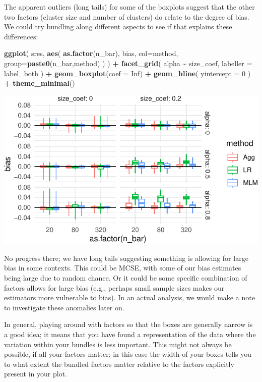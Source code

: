 \documentclass[
]{book}
\newenvironment{Shaded}{\begin{snugshade}}{\end{snugshade}}
\newcommand{\AttributeTok}[1]{\textcolor[rgb]{0.13,0.29,0.53}{#1}}
\newcommand{\ConstantTok}[1]{\textcolor[rgb]{0.56,0.35,0.01}{#1}}
\newcommand{\DecValTok}[1]{\textcolor[rgb]{0.00,0.00,0.81}{#1}}
\newcommand{\FunctionTok}[1]{\textcolor[rgb]{0.13,0.29,0.53}{\textbf{#1}}}
\newcommand{\NormalTok}[1]{#1}
\newcommand{\SpecialCharTok}[1]{\textcolor[rgb]{0.81,0.36,0.00}{\textbf{#1}}}
\begin{document}
The apparent outliers (long tails) for some of the boxplots suggest that the other two factors (cluster size and number of clusters) do relate to the degree of bias. We could try bundling along different aspects to see if that explains these differences:

\begin{Shaded}
\begin{Highlighting}[]
\FunctionTok{ggplot}\NormalTok{( sres, }\FunctionTok{aes}\NormalTok{( }\FunctionTok{as.factor}\NormalTok{(n\_bar), bias, }\AttributeTok{col=}\NormalTok{method, }\AttributeTok{group=}\FunctionTok{paste0}\NormalTok{(n\_bar,method) ) ) }\SpecialCharTok{+}
  \FunctionTok{facet\_grid}\NormalTok{( alpha }\SpecialCharTok{\textasciitilde{}}\NormalTok{  size\_coef, }\AttributeTok{labeller =}\NormalTok{ label\_both ) }\SpecialCharTok{+}
  \FunctionTok{geom\_boxplot}\NormalTok{(}\AttributeTok{coef =} \ConstantTok{Inf}\NormalTok{) }\SpecialCharTok{+}
  \FunctionTok{geom\_hline}\NormalTok{( }\AttributeTok{yintercept =} \DecValTok{0}\NormalTok{ ) }\SpecialCharTok{+}
  \FunctionTok{theme\_minimal}\NormalTok{()}
\end{Highlighting}
\end{Shaded}

\begin{center}\includegraphics[width=0.75\linewidth]{Designing-Simulations-in-R_files/figure-latex/clusterRCT_plot_bias_v2-1} \end{center}

No progress there; we have long tails suggesting something is allowing for large bias in some contexts.
This could be MCSE, with some of our bias estimates being large due to random chance.
Or it could be some specific combination of factors allows for large bias (e.g., perhaps small sample sizes makes our estimators more vulnerable to bias).
In an actual analysis, we would make a note to investigate these anomalies later on.

In general, playing around with factors so that the boxes are generally narrow is a good idea; it means that you have found a representation of the data where the variation within your bundles is less important.
This might not always be possible, if all your factors matter; in this case the width of your boxes tells you to what extent the bundled factors matter relative to the factors explicitly present in your plot.
\end{document}
